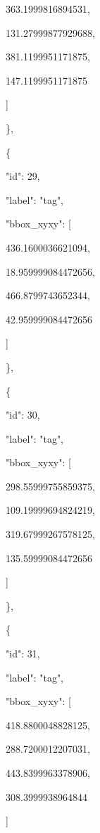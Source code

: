 \documentclass[10pt,a4paper]{article}
\begin{document}
        363.1999816894531,\allowbreak{}\par
        131.27999877929688,\allowbreak{}\par
        381.1199951171875,\allowbreak{}\par
        147.1199951171875\par
      ]\par
    \},\allowbreak{}\par
    \{\par
      "id":\allowbreak{} 29,\allowbreak{}\par
      "label":\allowbreak{} "tag",\allowbreak{}\par
      "bbox\_xyxy":\allowbreak{} [\par
        436.1600036621094,\allowbreak{}\par
        18.959999084472656,\allowbreak{}\par
        466.8799743652344,\allowbreak{}\par
        42.959999084472656\par
      ]\par
    \},\allowbreak{}\par
    \{\par
      "id":\allowbreak{} 30,\allowbreak{}\par
      "label":\allowbreak{} "tag",\allowbreak{}\par
      "bbox\_xyxy":\allowbreak{} [\par
        298.55999755859375,\allowbreak{}\par
        109.19999694824219,\allowbreak{}\par
        319.67999267578125,\allowbreak{}\par
        135.59999084472656\par
      ]\par
    \},\allowbreak{}\par
    \{\par
      "id":\allowbreak{} 31,\allowbreak{}\par
      "label":\allowbreak{} "tag",\allowbreak{}\par
      "bbox\_xyxy":\allowbreak{} [\par
        418.8800048828125,\allowbreak{}\par
        288.7200012207031,\allowbreak{}\par
        443.8399963378906,\allowbreak{}\par
        308.3999938964844\par
      ]\par
\end{document}
